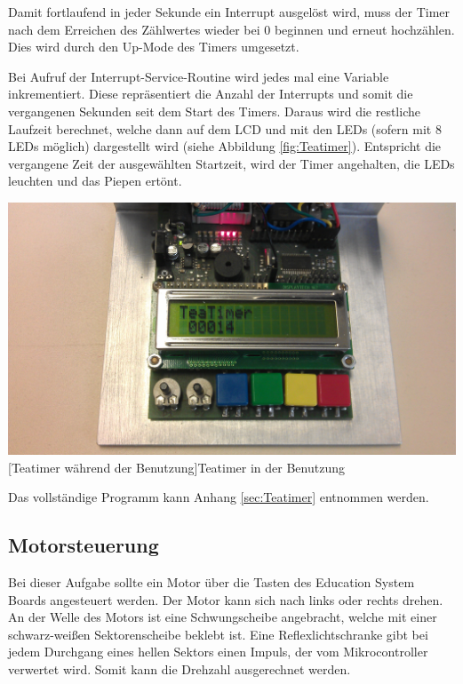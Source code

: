 \documentclass[12pt,a4paper,bibliography=totocnumbered,listof=totocnumbered]{scrartcl}
\begin{document}
\vspace{1em}


Damit fortlaufend in jeder Sekunde ein Interrupt ausgelöst wird, muss der Timer nach dem Erreichen des Zählwertes wieder bei 0 beginnen und erneut hochzählen. Dies wird durch den Up-Mode des Timers umgesetzt.

\vspace{1em}


Bei Aufruf der Interrupt-Service-Routine wird jedes mal eine Variable inkrementiert. Diese repräsentiert die Anzahl der Interrupts und somit die vergangenen Sekunden seit dem Start des Timers. Daraus wird die restliche Laufzeit berechnet, welche dann auf dem LCD und mit den LEDs (sofern mit 8 LEDs möglich) dargestellt wird (siehe Abbildung \ref{fig:Teatimer}). Entspricht die vergangene Zeit der ausgewählten Startzeit, wird der Timer angehalten, die LEDs leuchten und das Piepen ertönt.

\vspace{1em}


\vspace{1em}
\begin{minipage}{\linewidth}
	\centering
	\includegraphics[width=0.7\linewidth]{img/TeaTimer2.jpg}
	[Teatimer während der Benutzung]{Teatimer in der Benutzung}
	\label{fig:Teatimer}
\end{minipage}

\vspace{1em}
Das vollständige Programm kann Anhang \ref{sec:Teatimer} entnommen werden.

\pagebreak

\subsection{Motorsteuerung}
Bei dieser Aufgabe sollte ein Motor über die Tasten des Education System Boards angesteuert werden. Der Motor kann sich nach links oder rechts drehen. An der Welle des Motors ist eine Schwungscheibe angebracht, welche mit einer schwarz-weißen Sektorenscheibe beklebt ist. Eine Reflexlichtschranke gibt bei jedem Durchgang eines hellen Sektors einen Impuls, der vom Mikrocontroller verwertet wird. Somit kann die Drehzahl ausgerechnet werden.
\end{document}
